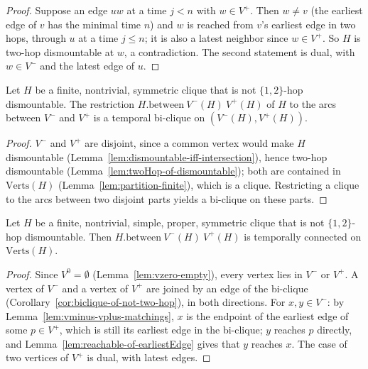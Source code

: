 \begin{proof}
  \leanok
  Suppose an edge $uw$ at a time $j < n$ with $w \in V^+$. Then $w \neq v$ (the
  earliest edge of $v$ has the minimal time $n$) and $w$ is reached from $v$'s
  earliest edge in two hops, through $u$ at a time $j \le n$; it is also a
  latest neighbor since $w \in V^+$. So $H$ is two-hop dismountable at $w$,
  a contradiction. The second statement is dual, with $w \in V^-$ and the latest
  edge of $u$.
\end{proof}

\begin{corollary}
  \label{cor:biclique-of-not-two-hop}
  \leanok
  Let $H$ be a finite, nontrivial, symmetric clique that is not
  $\{1,2\}$-hop dismountable. The restriction $H.\mathrm{between}\ V^-(H)\ V^+(H)$
  of $H$ to the arcs between $V^-$ and $V^+$ is a temporal bi-clique on
  $(V^-(H), V^+(H))$.
\end{corollary}

\begin{proof}
  \leanok
  $V^-$ and $V^+$ are disjoint, since a common vertex would make $H$
  dismountable (Lemma~\ref{lem:dismountable-iff-intersection}), hence two-hop
  dismountable (Lemma~\ref{lem:twoHop-of-dismountable}); both are contained in
  $\mathrm{Verts}(H)$ (Lemma~\ref{lem:partition-finite}), which is a clique.
  Restricting a clique to the arcs between two disjoint parts yields a
  bi-clique on these parts.
\end{proof}

\begin{lemma}
  \label{lem:between-tc}
  \leanok
  Let $H$ be a finite, nontrivial, simple, proper, symmetric clique that is not
  $\{1,2\}$-hop dismountable. Then $H.\mathrm{between}\ V^-(H)\ V^+(H)$ is
  temporally connected on $\mathrm{Verts}(H)$.
\end{lemma}

\begin{proof}
  \leanok
  Since $V^0 = \emptyset$ (Lemma~\ref{lem:vzero-empty}), every vertex lies in
  $V^-$ or $V^+$. A vertex of $V^-$ and a vertex of $V^+$ are joined by an edge
  of the bi-clique (Corollary~\ref{cor:biclique-of-not-two-hop}), in both
  directions. For $x, y \in V^-$: by Lemma~\ref{lem:vminus-vplus-matchings}, $x$
  is the endpoint of the earliest edge of some $p \in V^+$, which is still its
  earliest edge in the bi-clique; $y$ reaches $p$ directly, and
  Lemma~\ref{lem:reachable-of-earliestEdge} gives that $y$ reaches $x$. The case
  of two vertices of $V^+$ is dual, with latest edges.
\end{proof}

